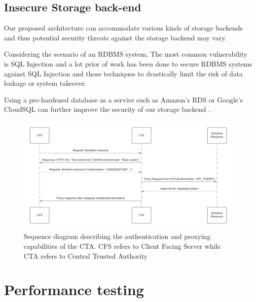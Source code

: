 \documentclass{sig-alternate-05-2015}
\begin{document}
\subsection{Insecure Storage back-end}

Our proposed architecture can accommodate various kinds of storage backends and thus potential security threats against the storage backend may vary. 

Considering the scenario of an RDBMS system, The most common vulnerability is SQL Injection and a lot prior of work has been done to secure RDBMS systems against SQL Injection \cite{halfond_amnesia:_2005, boyd_sqlrand:_2004, halfond_classification_2006} and those techniques to drastically limit the risk of data leakage or system takeover.

Using a pre-hardened database as a service such as Amazon's RDS or Google's CloudSQL can further improve the security of our storage backend \cite{curino_relational_2011} .

\begin{figure}[!ht]
  \centering
  \includegraphics[keepaspectratio=true,scale=0.2]{sequence_diagram}
  \caption{Sequence diagram describing the authentication and proxying capabilities of the CTA. CFS refers to Client Facing Server while CTA refers to Central Trusted Authority}
  \label{fig:ctaarchitecture}
\end{figure}


\section{Performance testing}
\end{document}
